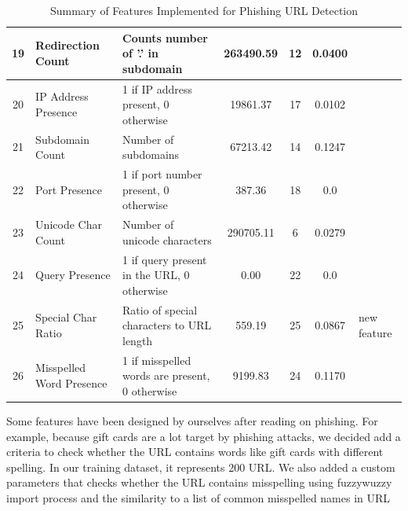 \documentclass{article}
\begin{document}
\begin{table}[H]
\begin{tabular}{|c|l|p{6cm}|c|c|c|l|}
            19           & Redirection Count               & Counts number of '.' in subdomain              & 263490.59          & 12                   & 0.0400                   &                                                 \\ \hline
            20           & IP Address Presence             & 1 if IP address present, 0 otherwise           & 19861.37           & 17                   & 0.0102                   & \cite{PhishSafe} \cite{LexicalFeatureSelection} \\ \hline
            21           & Subdomain Count                 & Number of subdomains                           & 67213.42           & 14                   & 0.1247                   & \cite{PhishSafe}                                \\ \hline
            22           & Port Presence                   & 1 if port number present, 0 otherwise          & 387.36             & 18                   & 0.0                      & \cite{LexicalFeatureSelection}                  \\ \hline
            23           & Unicode Char Count              & Number of unicode characters                   & 290705.11          & 6                    & 0.0279                   & \cite{LexicalFeatureSelection}                  \\ \hline
            24           & Query Presence                  & 1 if query present in the URL, 0 otherwise     & 0.00               & 22                   & 0.0                      & \cite{LexicalFeatureSelection}                  \\ \hline
            25           & Special Char Ratio              & Ratio of special characters to URL length      & 559.19             & 25                   & 0.0867                   & new feature\\ \hline
            26           & Misspelled Word Presence        & 1 if misspelled words are present, 0 otherwise & 9199.83 & 24 & 0.1170 & \\ \hline
        \end{tabular}
        \caption{Summary of Features Implemented for Phishing URL Detection}
        \label{tab:features}
    \end{table}





    Some features have been designed by ourselves after reading on phishing.
    For example, because gift cards are a lot target by phishing attacks, we decided add a criteria to check whether the URL contains words like gift cards with different spelling.
    In our training dataset, it represents 200 URL.
    We also added a custom parameters that checks whether the URL contains misspelling using fuzzywuzzy import process and the similarity to a list of common misspelled names in URL
\end{document}
